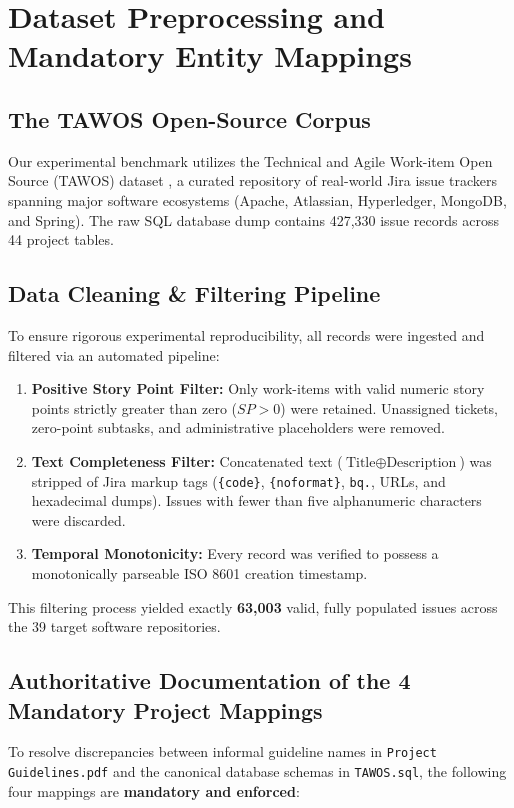 \documentclass[11pt,a4paper]{article}
\begin{document}
\section{Dataset Preprocessing and Mandatory Entity Mappings}
\label{sec:dataset}

\subsection{The TAWOS Open-Source Corpus}
Our experimental benchmark utilizes the Technical and Agile Work-item Open Source (TAWOS) dataset \cite{porru2022tawos}, a curated repository of real-world Jira issue trackers spanning major software ecosystems (Apache, Atlassian, Hyperledger, MongoDB, and Spring). The raw SQL database dump contains 427,330 issue records across 44 project tables.

\subsection{Data Cleaning & Filtering Pipeline}
To ensure rigorous experimental reproducibility, all records were ingested and filtered via an automated pipeline:
\begin{enumerate}
    \item \textbf{Positive Story Point Filter:} Only work-items with valid numeric story points strictly greater than zero ($SP > 0$) were retained. Unassigned tickets, zero-point subtasks, and administrative placeholders were removed.
    \item \textbf{Text Completeness Filter:} Concatenated text ($\text{Title} \oplus \text{Description}$) was stripped of Jira markup tags (\texttt{\{code\}}, \texttt{\{noformat\}}, \texttt{bq.}, URLs, and hexadecimal dumps). Issues with fewer than five alphanumeric characters were discarded.
    \item \textbf{Temporal Monotonicity:} Every record was verified to possess a monotonically parseable ISO 8601 creation timestamp.
\end{enumerate}
This filtering process yielded exactly \textbf{63,003} valid, fully populated issues across the 39 target software repositories.

\subsection{Authoritative Documentation of the 4 Mandatory Project Mappings}
To resolve discrepancies between informal guideline names in \texttt{Project Guidelines.pdf} and the canonical database schemas in \texttt{TAWOS.sql}, the following four mappings are \textbf{mandatory and enforced}:
\end{document}
